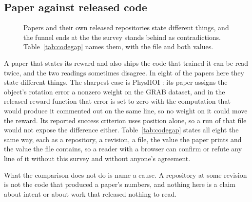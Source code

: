 \subsection{Paper against released code}
\label{sec:train:code}

\begin{figure}[!t]
  \centering
  \caption{Papers and their own released repositories state different things, and the funnel ends at the \fnKept{} the survey stands behind as contradictions. Table~\ref{tab:codegap} names them, with the file and both values.}
  \label{fig:codegap}
\end{figure}



A paper that states its reward and also ships the code that trained it can be read twice, and
the two readings sometimes disagree. In eight of the papers here they state different things.
The sharpest case is PhysHOI \cite{physhoi_2023}: its paper assigns the object's rotation error
a nonzero weight on the GRAB dataset, and in the released reward function that error is set to
zero with the computation that would produce it commented out on the same line, so no weight on
it could move the reward. Its reported success criterion uses position alone, so a run of that
file would not expose the difference either. Table~\ref{tab:codegap} states all eight the same
way, each as a repository, a revision, a file, the value the paper prints and the value the file
contains, so a reader with a browser can confirm or refute any line of it without this survey
and without anyone's agreement.

What the comparison does not do is name a cause. A repository at some revision is not the code
that produced a paper's numbers, and nothing here is a claim about intent or about work that
released nothing to read.

